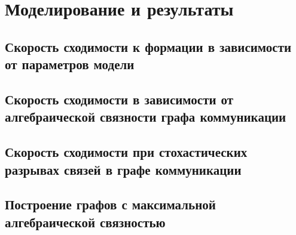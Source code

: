 \chapter{Моделирование и результаты} \label{results}



\section{Скорость сходимости к формации в зависимости от параметров модели}

\section{Скорость сходимости в зависимости от алгебраической связности графа коммуникации}

\section{Скорость сходимости при стохастических разрывах связей в графе коммуникации}

\section{Построение графов с максимальной алгебраической связностью}

\clearpage
